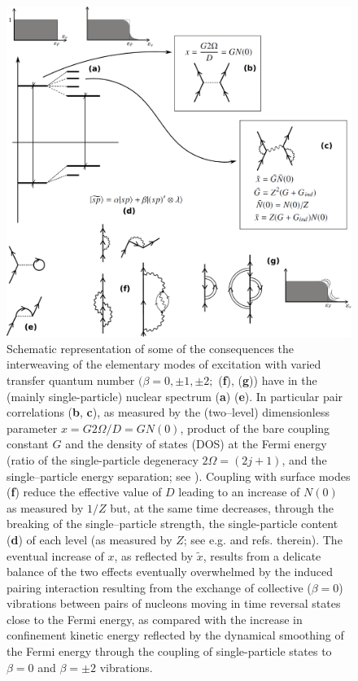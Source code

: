 \begin{figure}[h!]
\centerline {
\includegraphics*[width=12cm]{introduccion/figs/figintro6}
}
\caption{Schematic representation of some of the consequences the interweaving of the elementary modes of excitation with varied transfer quantum number $(\beta=0,\pm1,\pm2;$  (\textbf{f}), (\textbf{g})) have in the (mainly single-particle) nuclear spectrum (\textbf{a}) (\textbf{e}). In particular pair correlations (\textbf{b}, \textbf{c}), as measured by the (two--level) dimensionless parameter $x=G2\Omega/D=GN(0)$, product of the bare coupling constant $G$ and the density of states (DOS) at the Fermi energy (ratio of the single-particle degeneracy $2\Omega=(2j+1)$, and the single--particle energy separation; see \cite{Hogassen:61,Broglia:68}). Coupling with surface modes (\textbf{f}) reduce the effective value of $D$ leading to an increase of $N(0)$ as measured by $1/Z$ but, at the same time decreases, through the breaking of the single--particle strength, the single-particle content (\textbf{d}) of each level (as measured by $Z$; see e.g. \cite{Barranco:05} and refs. therein). The eventual increase of $x$, as reflected by $\tilde x$, results from a delicate balance of the two effects eventually overwhelmed by the induced pairing interaction resulting from the exchange of collective ($\beta=0$) vibrations between pairs of nucleons moving in time reversal states close to the Fermi energy, as compared with the increase in confinement kinetic energy reflected  by the dynamical smoothing of the Fermi energy through the coupling of single-particle states to $\beta=0$ and $\beta=\pm2$ vibrations.}
\label{figintro6}
\end{figure}
